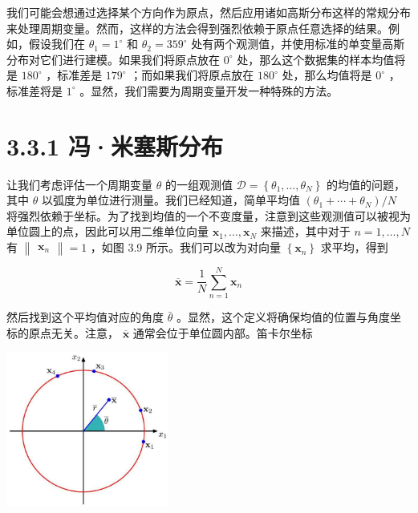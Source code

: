 \documentclass[10pt]{article}
\begin{document}
我们可能会想通过选择某个方向作为原点，然后应用诸如高斯分布这样的常规分布来处理周期变量。然而，这样的方法会得到强烈依赖于原点任意选择的结果。例如，假设我们在 \({\theta }_{1} = {1}^{ \circ  }\) 和 \({\theta }_{2} = {359}^{ \circ  }\) 处有两个观测值，并使用标准的单变量高斯分布对它们进行建模。如果我们将原点放在 \({0}^{ \circ  }\) 处，那么这个数据集的样本均值将是 \({180}^{ \circ  }\) ，标准差是 \({179}^{ \circ  }\) ；而如果我们将原点放在 \({180}^{ \circ  }\) 处，那么均值将是 \({0}^{ \circ  }\) ，标准差将是 \({1}^{ \circ  }\) 。显然，我们需要为周期变量开发一种特殊的方法。

\section*{3.3.1 冯·米塞斯分布}

让我们考虑评估一个周期变量 \(\theta\) 的一组观测值 \(\mathcal{D} = \left\{  {{\theta }_{1},\ldots ,{\theta }_{N}}\right\}\) 的均值的问题，其中 \(\theta\) 以弧度为单位进行测量。我们已经知道，简单平均值 \(\left( {{\theta }_{1} + \cdots  + {\theta }_{N}}\right) /N\) 将强烈依赖于坐标。为了找到均值的一个不变度量，注意到这些观测值可以被视为单位圆上的点，因此可以用二维单位向量 \({\mathbf{x}}_{1},\ldots ,{\mathbf{x}}_{N}\) 来描述，其中对于 \(n = 1,\ldots ,N\) 有 \(\begin{Vmatrix}{\mathbf{x}}_{n}\end{Vmatrix} = 1\) ，如图 3.9 所示。我们可以改为对向量 \(\left\{  {\mathbf{x}}_{n}\right\}\) 求平均，得到

\[
\overline{\mathbf{x}} = \frac{1}{N}\mathop{\sum }\limits_{{n = 1}}^{N}{\mathbf{x}}_{n} \tag{3.117}
\]

然后找到这个平均值对应的角度 \(\bar{\theta }\) 。显然，这个定义将确保均值的位置与角度坐标的原点无关。注意， \(\overline{\mathbf{x}}\) 通常会位于单位圆内部。笛卡尔坐标

\begin{center}
\includegraphics[max width=0.4\textwidth]{images/0194e279-9b28-703a-88f4-c3ac21e2010d_109_975_344_570_546_0.jpg}
\end{center}
\hspace*{3em} 
\end{document}
